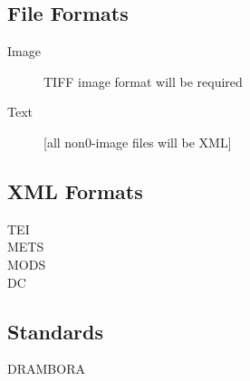 \subsection{File Formats}

\begin{description}
  \item[Image]{TIFF image format will be required}
  \item[Text][all non0-image files will be XML]
\end{description}

\subsection{XML Formats}
\begin{description}
  \item[TEI]{}
  \item[METS]{}
  \item[MODS]{}
  \item[DC]{}
\end{description}

\subsection{Standards}
\begin{description}
  \item[DRAMBORA]{}
\end{description}

